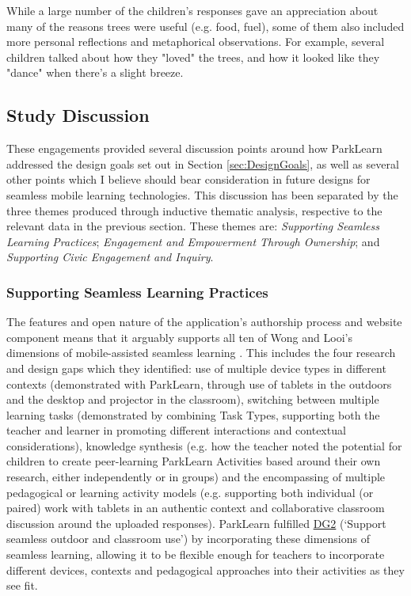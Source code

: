 While a large number of the children's responses gave an appreciation about many of the reasons trees were useful (e.g. food, fuel), some of them also included more personal reflections and metaphorical observations. For example, several children talked about how they "loved" the trees, and how it looked like they "dance" when there's a slight breeze.

\subsection{Study Discussion}
\label{sec:TeacherDiscussion}
These engagements provided several discussion points around how ParkLearn addressed the design goals set out in Section \ref{sec:DesignGoals}, as well as several other points which I believe should bear consideration in future designs for seamless mobile learning technologies. This discussion has been separated by the three themes produced through inductive thematic analysis, respective to the relevant data in the previous section. These themes are: \textit{Supporting Seamless Learning Practices}; \textit{Engagement and Empowerment Through Ownership}; and \textit{Supporting Civic Engagement and Inquiry}.

\subsubsection{Supporting Seamless Learning Practices}

The features and open nature of the application's authorship process and website component means that it arguably supports all ten of Wong and Looi’s dimensions of mobile-assisted seamless learning \citep{Wong2011}.  This includes the four research and design gaps which they identified: use of multiple device types in different contexts (demonstrated with ParkLearn, through use of tablets in the outdoors and the desktop and projector in the classroom), switching between multiple learning tasks (demonstrated by combining Task Types, supporting both the teacher and learner in promoting different interactions and contextual considerations), knowledge synthesis (e.g. how the teacher noted the potential for children to create peer-learning ParkLearn Activities based around their own research, either independently or in groups) and the encompassing of multiple pedagogical or learning activity models (e.g. supporting both individual (or paired) work with tablets in an authentic context and collaborative classroom discussion around the uploaded responses). ParkLearn fulfilled \hyperref[DG2]{DG2} (`Support seamless outdoor and classroom use') by incorporating these dimensions of seamless learning, allowing it to be flexible enough for teachers to incorporate different devices, contexts and pedagogical approaches into their activities as they see fit.
  
